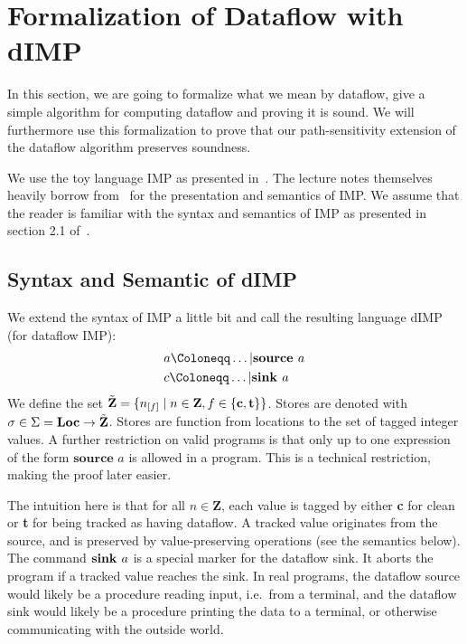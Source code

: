 \section{Formalization of Dataflow with dIMP}

In this section, we are going to formalize what we mean by dataflow,
give a simple algorithm for computing dataflow and proving it is sound.
We will furthermore use this formalization to prove that our
path-sensitivity extension of the dataflow algorithm preserves soundness.

We use the toy language IMP as presented in~\cite{sat}.
The lecture notes themselves heavily borrow from~\cite{fsopl} for the
presentation and semantics of IMP.
We assume that the reader is familiar with the syntax and semantics of IMP
as presented in section 2.1 of~\cite{sat}.

\subsection{Syntax and Semantic of dIMP}
We extend the syntax of IMP a little bit
and call the resulting language dIMP (for dataflow IMP):
\begin{align*}
    &a \Coloneqq \dots | \defaultsource\\
    &c \Coloneqq \dots | \defaultsink\\
\end{align*}
We define the set $\tilde{\textbf{Z}} =\{\flagged{} \mid n \in \textbf{Z}, f \in \{\textbf{c}, \textbf{t}\}\}$.
Stores are denoted with $\sigma \in \Sigma = \textbf{Loc} \to \tilde{\textbf{Z}}$.
Stores are function from locations to the set of tagged integer
values.
A further restriction on valid programs is that only up to one expression
of the form $\textbf{source } a$ is allowed in a program.
This is a technical restriction, making the proof later easier.

The intuition here is that for all $n \in \textbf{Z}$, 
each value is tagged by either \textbf{c} for clean or \textbf{t} for being tracked
as having dataflow.
A tracked value originates from the source, and is preserved by value-preserving
operations (see the semantics below).
The command $\textbf{sink }{a}$ is a special marker for the dataflow sink.
It aborts the program if a tracked value reaches the sink.
In real programs, the dataflow source would likely be a procedure reading input,
i.e.\ from a terminal, and the dataflow sink would likely be a procedure 
printing the data to a terminal, or otherwise communicating with the outside world.


